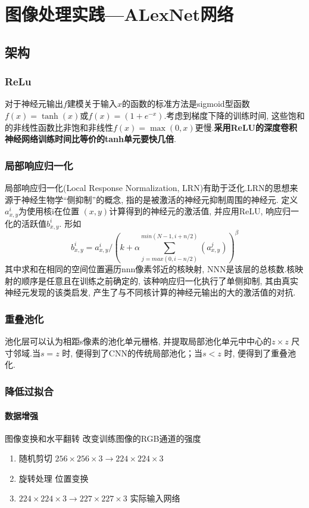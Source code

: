 \section{图像处理实践---ALexNet网络}
 
\subsection{架构}
\subsubsection{ReLu}
对于神经元输出$f$建模关于输入$x$的函数的标准方法是sigmoid型函数$f(x)=\tanh(x)$或$f(x)=(1+e^{-x})$.考虑到梯度下降的训练时间, 这些饱和的非线性函数比非饱和非线性$f(x)=\max(0, x)$更慢.\textbf{采用ReLU的深度卷积神经网络训练时间比等价的tanh单元要快几倍}.

\subsubsection{局部响应归一化}

局部响应归一化(Local Response Normalization, LRN)有助于泛化.LRN的思想来源于神经生物学“侧抑制”的概念, 指的是被激活的神经元抑制周围的神经元. 
定义$a_{x, y}^i$为使用核i在位置 $(x, y)$计算得到的神经元的激活值, 并应用ReLU, 响应归一化的活跃值$b_{x, y}^i $. 形如
$$b_{x, y}^i = a_{x, y}^i/(k + \alpha\sum_{j = max(0,  i-n/2)}^{min(N-1,  i + n/2)}(a_{x, y}^j))^\beta$$
其中求和在相同的空间位置遍历nnn像素邻近的核映射, NNN是该层的总核数.核映射的顺序是任意且在训练之前确定的, 该种响应归一化执行了单侧抑制, 其由真实神经元发现的该类启发, 产生了与不同核计算的神经元输出的大的激活值的对抗. 
\subsubsection{重叠池化}
池化层可以认为相距s像素的池化单元栅格, 并提取局部池化单元中中心的$z \times z$ 尺寸邻域.当$s=z$ 时, 便得到了CNN的传统局部池化；当$s<z$ 时, 便得到了重叠池化. 

\subsubsection{降低过拟合}
\paragraph{数据增强}
图像变换和水平翻转
改变训练图像的RGB通道的强度
\begin{enumerate}
    \item 随机剪切 $256 \times 256 \times 3  \to 224 \times 224 \times 3$ 
    \item 旋转处理 位置变换
    \item $224 \times 224 \times 3\to 227 \times 227 \times 3$  实际输入网络
\end{enumerate}

